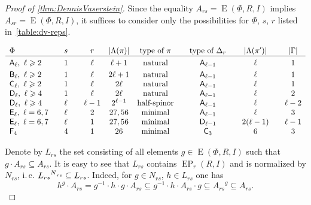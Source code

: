 \documentclass[11pt]{amsart}
\theoremstyle{plain}
\numberwithin{equation}{section}
\numberwithin{lemma}{section}
\theoremstyle{definition}
\theoremstyle{remark}
\DeclareMathOperator{\E}{E}
\DeclareMathOperator{\EP}{EP}
\newcommand{\rA}{\mathsf{A}}
\newcommand{\rB}{\mathsf{B}}
\newcommand{\rC}{\mathsf{C}}
\newcommand{\rD}{\mathsf{D}}
\newcommand{\rE}{\mathsf{E}}
\newcommand{\rF}{\mathsf{F}}
\def\ssub#1{\mathchoice
   {_{\lower2pt\hbox{$\scriptstyle #1$}}}
   {_{\lower2pt\hbox{$\scriptstyle #1$}}}
   {_{\lower1.5pt\hbox{$\scriptscriptstyle #1$}}}
   {_{\!\lower1.5pt\hbox{$\scriptscriptstyle #1$}}}}
\begin{document}
\begin{proof} [Proof of \cref{thm:DennisVaserstein}]
Since the equality $A_{rs} = \E(\Phi, R, I)$ implies $A_{sr} = \E(\Phi, R, I)$, it suffices to consider only the possibilities for $\Phi$, $s$, $r$ listed in~\cref{table:dv-reps}.
\begin{table}[htb]
\[\begin{array}{l @{\qquad} l @{\qquad} c @{\quad} c @{\quad} c @{\qquad} c @{\qquad} c @{\qquad} c}
\Phi                                 & s    &r      & |\Lambda(\pi)| & \text{type of $\pi$} & \text{type of $\Delta_r$} & |\Lambda(\pi')|& |\Gamma|  \\ \hline\vphantom{\Bigl(}
\rA_\ell, \ \ell\geqslant 2           & 1    &\ell   & \ell+1         & \text{natural}       & \rA_{\ell-1}              & \ell           & 1  \\     
\rB_\ell, \ \ell\geqslant 2           & 1    &\ell   & 2\ell+1        & \text{natural}       & \rA_{\ell-1}              & \ell           & 1  \\     
\rC_\ell, \ \ell\geqslant 2           & 1    &\ell   & 2\ell          & \text{natural}       & \rA_{\ell-1}              & \ell           & 1  \\
\rD_\ell, \ \ell\geqslant 4           & 1    &\ell   & 2\ell          & \text{natural}       & \rA_{\ell-1}              & \ell           & 2  \\ 
\rD_\ell, \ \ell\geqslant 4           & \ell &\ell-1 & 2^{\ell-1}     & \text{half-spinor}   & \rA_{\ell-1}              & \ell           & \ell-2  \\
\rE_\ell, \ \ell=6, 7                  & \ell &2      & 27, 56         & \text{minimal}       & \rA_{\ell-1}              & \ell           & 3       \\ 
\rE_\ell, \ \ell=6, 7                  & \ell &1      & 27, 56         & \text{minimal}       & \rD_{\ell-1}              & 2(\ell-1)      & \ell-1  \\
\rF_4                                & 4    &1     & 26             & \text{minimal}       & \rC_3                     & 6              & 3\end{array}\]
 \caption{List of representations used in the proof of \cref{thm:DennisVaserstein}.} \label{table:dv-reps}
\end{table}

Denote by $L_{rs}$ the set consisting of all elements $g\in \E(\Phi, R, I)$ such that $g \cdot A_{rs} \subseteq A_{rs}$.
It is easy to see that $L_{rs}$ contains $\EP_r(R, I)$ and is normalized by $N_{rs}$, i.\,e. ${L_{rs}}^{N\ssub{rs}}\subseteq L_{rs}$. Indeed, for $g\in N_{rs}$, $h\in L_{rs}$ one has
\begin{equation}\label{rel:NnormL} h^g \cdot A_{rs} = g^{-1} \cdot h \cdot g \cdot A_{rs} \subseteq g^{-1} \cdot h \cdot A_{rs} \cdot g \subseteq {A_{rs}}^g \subseteq A_{rs}.\end{equation}


\end{proof}
\end{document}
